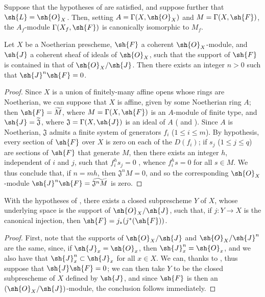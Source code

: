 \begin{corollary}[9.3.3]
\label{I.9.3.3}
Suppose that the hypotheses of  are satisfied, and suppose further that
$\sh{L}=\sh{O}_X$. Then, setting $A=\Gamma(X,\sh{O}_X)$ and $M=\Gamma(X,\sh{F})$, the $A_f$-module
$\Gamma(X_f,\sh{F})$ is canonically isomorphic to $M_f$.
\end{corollary}

\begin{proposition}[9.3.4]
\label{I.9.3.4}
Let $X$ be a Noetherian prescheme, $\sh{F}$ a coherent $\sh{O}_X$-module, and $\sh{J}$ a
coherent sheaf of ideals of $\sh{O}_X$, such that the support of $\sh{F}$ is contained in that
of $\sh{O}_X/\sh{J}$. Then there exists an integer $n>0$ such that $\sh{J}^n\sh{F}=0$.
\end{proposition}

\begin{proof}
Since $X$ is a union of finitely-many affine opens whose rings are Noetherian, we can suppose
that $X$ is affine, given by some Noetherian ring $A$; then $\sh{F}=\widetilde{M}$, where
$M=\Gamma(X,\sh{F})$ is an $A$-module of finite type, and $\sh{J}=\widetilde{\mathfrak{J}}$,
where $\mathfrak{J}=\Gamma(X,\sh{J})$ is an ideal of $A$ ( and
). Since $A$ is Noetherian, $\mathfrak{J}$ admits a finite system of
generators $f_i$ ($1\leq i\leq m$). By hypothesis, every section of $\sh{F}$ over
$X$ is zero on each of the $D(f_i)$; if $s_j$ ($1\leq j\leq q$) are sections of
$\sh{F}$ that generate $M$, then there exists an integer $h$, independent of $i$ and $j$,
such that $f_i^h s_j=0$ , whence $f_i^h s=0$ for all $s\in M$. We thus
conclude that, if $n=mh$, then $\mathfrak{J}^n M=0$, and so the corresponding $\sh{O}_X$-module
$\sh{J}^n\sh{F}=\widetilde{\mathfrak{J}^n M}$  is zero.
\end{proof}

\begin{corollary}[9.3.5]
\label{I.9.3.5}
With the hypotheses of , there exists a closed subprescheme $Y$ of $X$,
whose underlying space is the support of $\sh{O}_X/\sh{J}$, such that, if $j:Y\to X$ is the
canonical injection, then $\sh{F}=j_*(j^*(\sh{F}))$.
\end{corollary}

\begin{proof}
First, note that the supports of $\sh{O}_X/\sh{J}$ and $\sh{O}_X/\sh{J}^n$ are the same,
since, if $\sh{J}_x=\sh{O}_x$, then $\sh{J}_x^n=\sh{O}_x$, and we also have that
$\sh{J}_x^n\subset\sh{J}_x$ for all $x\in X$. We can, thanks to , thus
suppose that $\sh{J}\sh{F}=0$; we can then take $Y$ to be the closed subprescheme of $X$
defined by $\sh{J}$, and since $\sh{F}$ is then an $(\sh{O}_X/\sh{J})$-module, the conclusion
follows immediately.
\end{proof}

